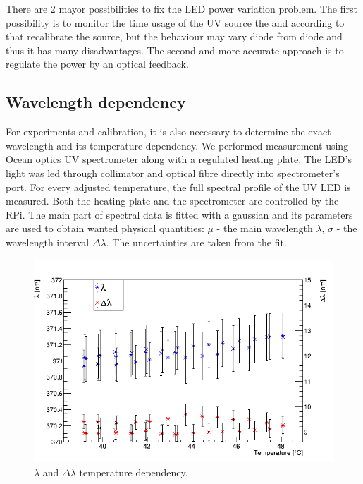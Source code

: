 \par
There are 2 mayor possibilities to fix the LED power variation problem. The first possibility is to monitor the time usage of the UV source the and according to that recalibrate the source, but the behaviour may vary diode from diode and thus it has many disadvantages. The second and more accurate approach is to regulate the power by an optical feedback.    


\subsection{Wavelength dependency}

For experiments and calibration, it is also necessary to determine the exact wavelength and its temperature dependency. We performed measurement using Ocean optics UV spectrometer along with a regulated heating plate. The LED's light was led through collimator and optical fibre directly into spectrometer's port. For every adjusted temperature, the full spectral profile of the UV LED is measured. Both the heating plate and the spectrometer are controlled by the RPi. The main part of spectral data is fitted with a gaussian and its parameters are used to obtain wanted physical quantities: $\mu$ - the main wavelength $\lambda$, $\sigma$ - the wavelength interval $\Delta \lambda$. The uncertainties are taken from the fit.


\begin{figure}[H]
 \centering
 \includegraphics[scale=0.65]{./pictures/SpectreShakeWave}
 \caption{$\lambda$ and $\Delta \lambda$ temperature dependency.}
 \label{wavdep}
\end{figure}

